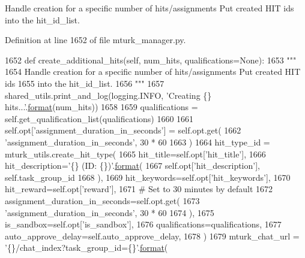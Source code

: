 \begin{DoxyVerb}Handle creation for a specific number of hits/assignments Put created HIT ids
into the hit_id_list.
\end{DoxyVerb}
 

Definition at line 1652 of file mturk\+\_\+manager.\+py.


\begin{DoxyCode}
1652     \textcolor{keyword}{def }create\_additional\_hits(self, num\_hits, qualifications=None):
1653         \textcolor{stringliteral}{"""}
1654 \textcolor{stringliteral}{        Handle creation for a specific number of hits/assignments Put created HIT ids}
1655 \textcolor{stringliteral}{        into the hit\_id\_list.}
1656 \textcolor{stringliteral}{        """}
1657         shared\_utils.print\_and\_log(logging.INFO, \textcolor{stringliteral}{'Creating \{\} hits...'}.\hyperlink{namespaceparlai_1_1chat__service_1_1services_1_1messenger_1_1shared__utils_a32e2e2022b824fbaf80c747160b52a76}{format}(num\_hits))
1658 
1659         qualifications = self.get\_qualification\_list(qualifications)
1660 
1661         self.opt[\textcolor{stringliteral}{'assignment\_duration\_in\_seconds'}] = self.opt.get(
1662             \textcolor{stringliteral}{'assignment\_duration\_in\_seconds'}, 30 * 60
1663         )
1664         hit\_type\_id = mturk\_utils.create\_hit\_type(
1665             hit\_title=self.opt[\textcolor{stringliteral}{'hit\_title'}],
1666             hit\_description=\textcolor{stringliteral}{'\{\} (ID: \{\})'}.\hyperlink{namespaceparlai_1_1chat__service_1_1services_1_1messenger_1_1shared__utils_a32e2e2022b824fbaf80c747160b52a76}{format}(
1667                 self.opt[\textcolor{stringliteral}{'hit\_description'}], self.task\_group\_id
1668             ),
1669             hit\_keywords=self.opt[\textcolor{stringliteral}{'hit\_keywords'}],
1670             hit\_reward=self.opt[\textcolor{stringliteral}{'reward'}],
1671             \textcolor{comment}{# Set to 30 minutes by default}
1672             assignment\_duration\_in\_seconds=self.opt.get(
1673                 \textcolor{stringliteral}{'assignment\_duration\_in\_seconds'}, 30 * 60
1674             ),
1675             is\_sandbox=self.opt[\textcolor{stringliteral}{'is\_sandbox'}],
1676             qualifications=qualifications,
1677             auto\_approve\_delay=self.auto\_approve\_delay,
1678         )
1679         mturk\_chat\_url = \textcolor{stringliteral}{'\{\}/chat\_index?task\_group\_id=\{\}'}.\hyperlink{namespaceparlai_1_1chat__service_1_1services_1_1messenger_1_1shared__utils_a32e2e2022b824fbaf80c747160b52a76}{format}(

\end{DoxyCode}
